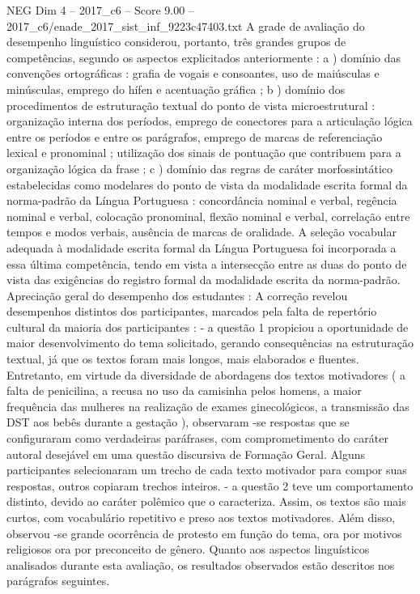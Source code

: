 \begin{textsample}{NEG Dim 4 – 2017\_c6 – Score 9.00 – 2017\_c6/enade\_2017\_sist\_inf\_9223c47403.txt}
A grade de avaliação do desempenho linguístico considerou, portanto, três grandes grupos de competências, segundo os aspectos explicitados anteriormente : a ) domínio das convenções ortográficas : grafia de vogais e consoantes, uso de maiúsculas e minúsculas, emprego do hífen e acentuação gráfica ; b ) domínio dos procedimentos de estruturação textual do ponto de vista microestrutural : organização interna dos períodos, emprego de conectores para a articulação lógica entre os períodos e entre os parágrafos, emprego de marcas de referenciação lexical e pronominal ; utilização dos sinais de pontuação que contribuem para a organização lógica da frase ; c ) domínio das regras de caráter morfossintático estabelecidas como modelares do ponto de vista da modalidade escrita formal da norma-padrão da Língua Portuguesa : concordância nominal e verbal, regência nominal e verbal, colocação pronominal, flexão nominal e verbal, correlação entre tempos e modos verbais, ausência de marcas de oralidade.
A seleção vocabular adequada à modalidade escrita formal da Língua Portuguesa foi incorporada a essa última competência, tendo em vista a intersecção entre as duas do ponto de vista das exigências do registro formal da modalidade escrita da norma-padrão.
Apreciação geral do desempenho dos estudantes : A correção revelou desempenhos distintos dos participantes, marcados pela falta de repertório cultural da maioria dos participantes : - a questão 1 propiciou a oportunidade de maior desenvolvimento do tema solicitado, gerando consequências na estruturação textual, já que os textos foram mais longos, mais elaborados e fluentes.
Entretanto, em virtude da diversidade de abordagens dos textos motivadores ( a falta de penicilina, a recusa no uso da camisinha pelos homens, a maior frequência das mulheres na realização de exames ginecológicos, a transmissão das DST aos bebês durante a gestação ), observaram -se respostas que se configuraram como verdadeiras paráfrases, com comprometimento do caráter autoral desejável em uma questão discursiva de Formação Geral.
Alguns participantes selecionaram um trecho de cada texto motivador para compor suas respostas, outros copiaram trechos inteiros. - a questão 2 teve um comportamento distinto, devido ao caráter polêmico que o caracteriza.
Assim, os textos são mais curtos, com vocabulário repetitivo e preso aos textos motivadores.
Além disso, observou -se grande ocorrência de protesto em função do tema, ora por motivos religiosos ora por preconceito de gênero.
Quanto aos aspectos linguísticos analisados durante esta avaliação, os resultados observados estão descritos nos parágrafos seguintes.

\end{textsample}
